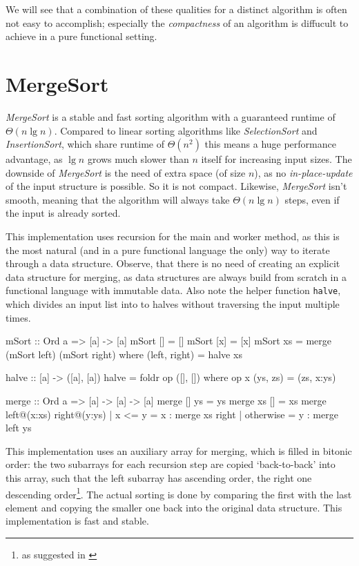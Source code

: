 We will see that a combination of these qualities for a distinct algorithm is often not easy to accomplish; especially the \emph{compactness} of an algorithm is diffucult to achieve in a pure functional setting.

\section{MergeSort}

\emph{MergeSort} is a stable and fast sorting algorithm with a guaranteed runtime of $\Theta (n \lg n)$.
Compared to linear sorting algorithms like \emph{SelectionSort} and \emph{InsertionSort}, which share runtime of $\Theta (n^2)$ this means a huge performance advantage, as $\lg n$ grows much slower than $n$ itself for increasing input sizes.  
The downside of \emph{MergeSort} is the need of extra space (of size $n$), as no \emph{in-place-update} of the input structure is possible. So it is not compact. Likewise, \emph{MergeSort} isn't smooth, meaning that the algorithm will always take $\Theta (n \lg n)$ steps, even if the input is already sorted.

\begin{impl} \label{impl:mshaskell}
This implementation uses recursion for the main and worker method, as this is the most natural (and in a pure functional language the only) way to iterate through a data structure.
Observe, that there is no need of creating an explicit data structure for merging, as data structures are always build from scratch in a functional language with immutable data.
Also note the helper function \texttt{halve}, which divides an input list into to halves without traversing the input multiple times.
\end{impl}

\begin{haskellcode}
mSort :: Ord a => [a] -> [a]
mSort [] = []
mSort [x] = [x]
mSort xs = merge (mSort left) (mSort right)
           where (left, right) = halve xs

halve :: [a] -> ([a], [a])
halve = foldr op ([], []) where op x (ys, zs) = (zs, x:ys)

merge :: Ord a => [a] -> [a] -> [a]
merge [] ys = ys
merge xs [] = xs
merge left@(x:xs) right@(y:ys)
    | x <= y    = x : merge xs right
    | otherwise = y : merge left ys
\end{haskellcode}

\begin{impl} 
This implementation uses an auxiliary array for merging, which is filled in bitonic order:
the two subarrays for each recursion step are copied `back-to-back' into this array, such that the left subarray has ascending order, the right one descending order\footnote{as suggested in \autocite[chapter 8]{algsc98}}.
The actual sorting is done by comparing the first with the last element and copying the smaller one back into the original data structure. This implementation is fast and stable.
\end{impl}

